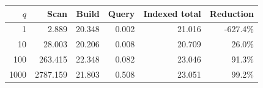 \begin{tabular}{rrrrrr}
\toprule
$q$ & Scan & Build & Query & Indexed total & Reduction \\
\midrule
1 & 2.889 & 20.348 & 0.002 & 21.016 & -627.4\% \\
10 & 28.003 & 20.206 & 0.008 & 20.709 & 26.0\% \\
100 & 263.415 & 22.348 & 0.082 & 23.046 & 91.3\% \\
1000 & 2787.159 & 21.803 & 0.508 & 23.051 & 99.2\% \\
\bottomrule
\end{tabular}
